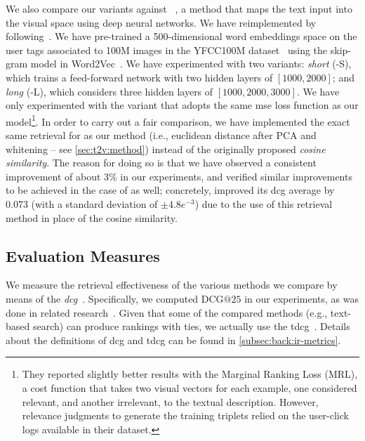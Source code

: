 We also compare our \ttv{} variants against \wordvisual{}~\cite{dong2018predicting}, a method that maps the text input into the visual space using deep neural networks.
We have reimplemented \wordvisual{} by following~\cite{dong2018predicting}.
We have pre-trained a 500-dimensional word embeddings space on the user tags associated to 100M images in the YFCC100M dataset~\cite{thomee2016yfcc100m} using the skip-gram model in Word2Vec~\cite{mikolov2013distributed}.
We have experimented with two variants: \emph{short} (\wordvisual{}-S), which trains a feed-forward network with two hidden layers of $[1000, 2000]$; and \emph{long} (\wordvisual{}-L), which considers three hidden layers of $[1000, 2000, 3000]$.
We have only experimented with the variant that adopts the same \gls{mse} loss function as our model\footnote{They reported slightly better results with the Marginal Ranking Loss (MRL), a cost function that takes two visual vectors for each example, one considered relevant, and another irrelevant, to the textual description. However, relevance judgments to generate the training triplets relied on the user-click logs available in their dataset.}. %
In order to carry out a fair comparison, we have implemented the exact same retrieval for \wordvisual{} as our method (i.e.,  euclidean distance after PCA and whitening -- see \ref{sec:t2v:method}) instead of the originally proposed \emph{cosine similarity}.
The reason for doing so is that we have observed a consistent improvement of about 3\% in our experiments, and verified similar improvements to be achieved in the case of \wordvisual{} as well;
concretely, \wordvisual{} improved its \gls{dcg} average by 0.073 (with a standard deviation of $\pm4.8e^{-3}$) due to the use of this retrieval method in place of the cosine similarity.

\subsection{Evaluation Measures}
\label{subsec:t2v:eval}

We measure the retrieval effectiveness of the various methods we compare by means of the \emph{\acrfull{dcg}}~\cite{jarvelin2002cumulated}.
%
%
Specifically, we computed $\mathrm{DCG}@25$ in our experiments, as was done in related research~\cite{hua2013clickage,dong2018predicting}.
Given that some of the compared methods (e.g., text-based search) can produce rankings with ties, we actually use the \gls{tdcg}~\cite{mcsherry2008computing}.
Details about the definitions of \gls{dcg} and \gls{tdcg} can be found in \ref{subsec:back:ir-metrics}.

